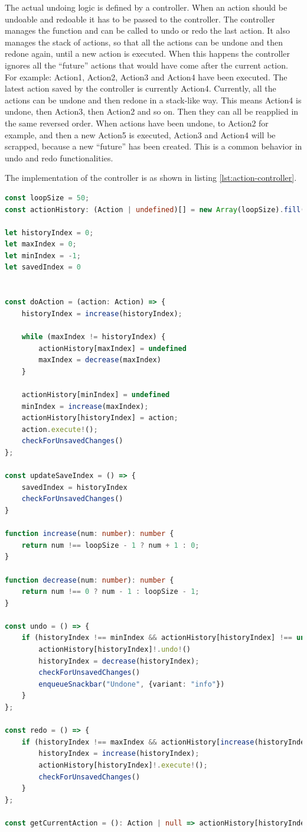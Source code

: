 The actual undoing logic is defined by a controller. When an action should be undoable and redoable it has to be passed to the controller. The controller manages the function and can be called to undo or redo the last action. It also manages the stack of actions, so that all the actions can be undone and then redone again, until a new action is executed. When this happens the controller ignores all the ``future'' actions that would have come after the current action. For example: Action1, Action2, Action3 and Action4 have been executed. The latest action saved by the controller is currently Action4. Currently, all the actions can be undone and then redone in a stack-like way. This means Action4 is undone, then Action3, then Action2 and so on. Then they can all be reapplied in the same reversed order. When actions have been undone, to Action2 for example, and then a new Action5 is executed, Action3 and Action4 will be scrapped, because a new ``future'' has been created. This is a common behavior in undo and redo functionalities.

The implementation of the controller is as shown in listing \ref{lst:action-controller}.

\begin{lstlisting}[language=TypeScript,caption={Action controller implementation},label={lst:action-controller}]
const loopSize = 50;
const actionHistory: (Action | undefined)[] = new Array(loopSize).fill(undefined);

let historyIndex = 0;
let maxIndex = 0;
let minIndex = -1;
let savedIndex = 0


const doAction = (action: Action) => {
    historyIndex = increase(historyIndex);

    while (maxIndex != historyIndex) {
        actionHistory[maxIndex] = undefined
        maxIndex = decrease(maxIndex)
    }

    actionHistory[minIndex] = undefined
    minIndex = increase(maxIndex);
    actionHistory[historyIndex] = action;
    action.execute!();
    checkForUnsavedChanges()
};

const updateSaveIndex = () => {
    savedIndex = historyIndex
    checkForUnsavedChanges()
}

function increase(num: number): number {
    return num !== loopSize - 1 ? num + 1 : 0;
}

function decrease(num: number): number {
    return num !== 0 ? num - 1 : loopSize - 1;
}

const undo = () => {
    if (historyIndex !== minIndex && actionHistory[historyIndex] !== undefined) {
        actionHistory[historyIndex]!.undo!()
        historyIndex = decrease(historyIndex);
        checkForUnsavedChanges()
        enqueueSnackbar("Undone", {variant: "info"})
    }
};

const redo = () => {
    if (historyIndex !== maxIndex && actionHistory[increase(historyIndex)] !== undefined) {
        historyIndex = increase(historyIndex);
        actionHistory[historyIndex]!.execute!();
        checkForUnsavedChanges()
    }
};

const getCurrentAction = (): Action | null => actionHistory[historyIndex] ?? null;
\end{lstlisting}

